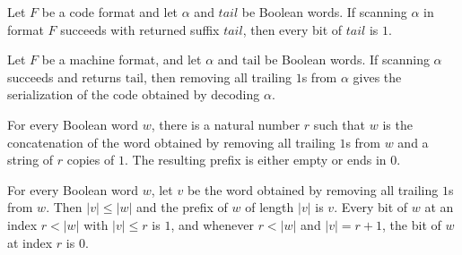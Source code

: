 \begin{lemma}
\label{Turing.MachineFormat.canonScan_all}
\leanok
{}
Let $F$ be a code format and let $\alpha$ and $tail$ be Boolean words. If scanning
$\alpha$ in format $F$ succeeds with returned suffix $tail$, then every bit of $tail$ is
$1$.
\end{lemma}

\begin{lemma}
\label{Turing.MachineFormat.canonStrip_of_scan}
\leanok
{}
Let $F$ be a machine format, and let $\alpha$ and $\mathrm{tail}$ be Boolean words. If
scanning $\alpha$ succeeds and returns $\mathrm{tail}$, then removing all trailing $1$s
from $\alpha$ gives the serialization of the code obtained by decoding $\alpha$.
\end{lemma}

\begin{lemma}
\label{Turing.MachineFormat.canonStrip_split}
\leanok
{}
For every Boolean word $w$, there is a natural number $r$ such that $w$ is the
concatenation of the word obtained by removing all trailing $1$s from $w$ and a string
of $r$ copies of $1$. The resulting prefix is either empty or ends in $0$.
\end{lemma}

\begin{lemma}
\label{Turing.MachineFormat.canonStrip_boundary}
\leanok
{}
For every Boolean word $w$, let $v$ be the word obtained by removing all trailing $1$s
from $w$. Then $|v|\le |w|$ and the prefix of $w$ of length $|v|$ is $v$. Every bit of
$w$ at an index $r<|w|$ with $|v|\le r$ is $1$, and whenever $r<|w|$ and $|v|=r+1$, the
bit of $w$ at index $r$ is $0$.
\end{lemma}

